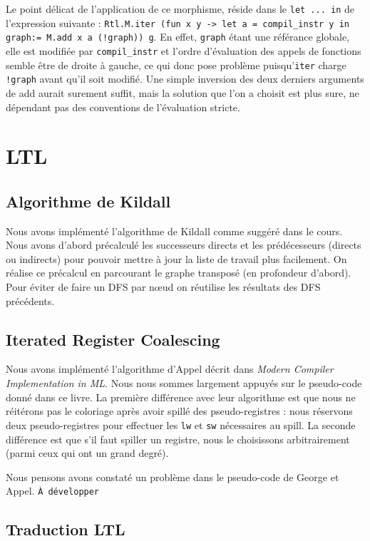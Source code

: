 \documentclass[a4paper]{article}
\begin{document}
Le point délicat de l'application de ce morphisme, réside dans le \texttt{let ... in} de l'expression suivante :
\texttt{Rtl.M.iter (fun x y -> let a = compil\_instr y in graph:= M.add
x a (!graph)) g}. En effet, \texttt{graph} étant une référance globale, elle est
modifiée par \texttt{compil\_instr} et l'ordre d'évaluation des appels
de fonctions semble être de droite à gauche, ce qui donc pose problème
puisqu'\texttt{iter} charge \texttt{!graph} avant qu'il soit modifié. Une simple inversion des
deux derniers arguments de add aurait surement suffit, mais la solution que l'on a choisit est
plus sure, ne dépendant pas des conventions de l'évaluation stricte.
\section{LTL}
\subsection{Algorithme de Kildall}

Nous avons implémenté l'algorithme de Kildall comme suggéré dans le cours. Nous avons d'abord précalculé
les successeurs directs et les prédécesseurs (directs ou indirects) pour pouvoir mettre à jour la liste de
travail plus facilement. On réalise ce précalcul en parcourant le graphe transposé (en profondeur d'abord).
Pour éviter de faire un DFS par nœud on réutilise les résultats des DFS précédents.

\subsection{Iterated Register Coalescing}

Nous avons implémenté l'algorithme d'Appel décrit dans \emph{Modern Compiler Implementation in ML}.
Nous nous sommes largement appuyés sur le pseudo-code donné dans ce livre. La première différence avec
leur algorithme est que nous ne réitérons pas le coloriage après avoir spillé des pseudo-registres :
nous réservons deux pseudo-registres pour effectuer les \texttt{lw} et \texttt{sw} nécessaires au spill.
La seconde différence est que s'il faut spiller un registre, nous le choisissons arbitrairement (parmi ceux
qui ont un grand degré).

Nous pensons avons constaté un problème dans le pseudo-code de George et Appel. \texttt{À développer}

\subsection{Traduction LTL}
\end{document}
